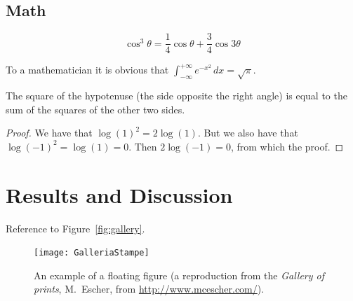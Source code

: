 \documentclass[
10pt, %
a4paper, %
oneside, %
headinclude,footinclude, %
BCOR5mm, %
]{scrartcl}
\begin{document}
\subsection{Math}

\lipsum[4] %

\begin{equation}
\cos^3 \theta =\frac{1}{4}\cos\theta+\frac{3}{4}\cos 3\theta
\label{eq:refname2}
\end{equation}

\lipsum[5] %

\begin{definition}[Gauss] 
To a mathematician it is obvious that
$\int_{-\infty}^{+\infty}
e^{-x^2}\,dx=\sqrt{\pi}$. 
\end{definition} 

\begin{theorem}[Pythagoras]
The square of the hypotenuse (the side opposite the right angle) is equal to the sum of the squares of the other two sides.
\end{theorem}

\begin{proof} 
We have that $\log(1)^2 = 2\log(1)$.
But we also have that $\log(-1)^2=\log(1)=0$.
Then $2\log(-1)=0$, from which the proof.
\end{proof}


\section{Results and Discussion}

Reference to Figure~\vref{fig:gallery}. %

\begin{figure}[tb]
\centering 
\texttt{[image: GalleriaStampe]} 
\caption[An example of a floating figure]{An example of a floating figure (a reproduction from the \emph{Gallery of prints}, M.~Escher, from \url{http://www.mcescher.com/}).} %
\label{fig:gallery} 
\end{figure}

\lipsum[10] %
\end{document}
